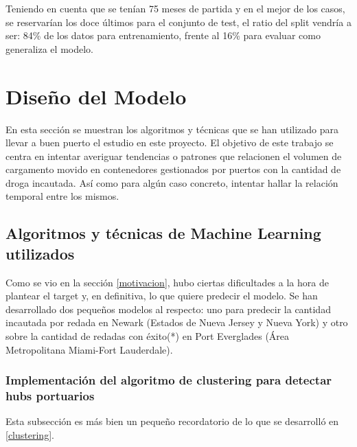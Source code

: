 \documentclass[12pt]{article}
\begin{document}
	Teniendo en cuenta que se tenían 75 meses de partida y en el mejor de los casos, se reservarían los doce últimos para el conjunto de test, el ratio del split vendría a ser: 84\% de los datos para entrenamiento, frente al 16\% para evaluar como generaliza el modelo.
	

\newpage
\section{\label{Diseño}Diseño del Modelo}
En esta sección se muestran los algoritmos y técnicas que se han utilizado para llevar a buen puerto el estudio en este proyecto. El objetivo de este trabajo se centra en intentar averiguar tendencias o patrones que relacionen el volumen de cargamento movido en contenedores gestionados por puertos con la cantidad de droga incautada. Así como para algún caso concreto, intentar hallar la relación temporal entre los mismos.

	\subsection{Algoritmos y técnicas de Machine Learning utilizados}

	
	Como se vio en la sección \ref{motivacion}, hubo ciertas dificultades a la hora de plantear el target y, en definitiva, lo que quiere predecir el modelo. Se han desarrollado dos pequeños modelos al respecto: uno para predecir la cantidad incautada por redada en Newark (Estados de Nueva Jersey y Nueva York) y otro sobre la cantidad de redadas con éxito(*) en Port Everglades (Área Metropolitana Miami-Fort Lauderdale).
	
	\subsubsection{Implementación del algoritmo de clustering para detectar hubs portuarios}
	Esta subsección es más bien un pequeño recordatorio de lo que se desarrolló en \ref{clustering}.
	
\end{document}
